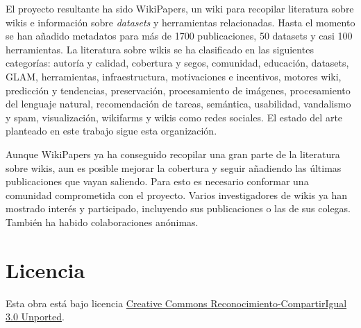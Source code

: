 \documentclass[11pt,onecolumn]{article}
\begin{document}

El proyecto resultante ha sido WikiPapers, un wiki para recopilar literatura sobre wikis e información sobre \emph{datasets} y herramientas relacionadas. Hasta el momento se han añadido metadatos para más de 1700 publicaciones, 50 datasets y casi 100 herramientas. La literatura sobre wikis se ha clasificado en las siguientes categorías: autoría y calidad, cobertura y segos, comunidad, educación, datasets, GLAM, herramientas, infraestructura, motivaciones e incentivos, motores wiki, predicción y tendencias, preservación, procesamiento de imágenes, procesamiento del lenguaje natural, recomendación de tareas, semántica, usabilidad, vandalismo y spam, visualización, wikifarms y wikis como redes sociales. El estado del arte planteado en este trabajo sigue esta organización.

Aunque WikiPapers ya ha conseguido recopilar una gran parte de la literatura sobre wikis, aun es posible mejorar la cobertura y seguir añadiendo las últimas publicaciones que vayan saliendo. Para esto es necesario conformar una comunidad comprometida con el proyecto. Varios investigadores de wikis ya han mostrado interés y participado, incluyendo sus publicaciones o las de sus colegas. También ha habido colaboraciones anónimas.



\clearpage

        


%
%

\section*{Licencia}
Esta obra está bajo licencia \href{http://creativecommons.org/licenses/by-sa/3.0/}{Creative Commons Reconocimiento-CompartirIgual 3.0 Unported}.
\end{document}
